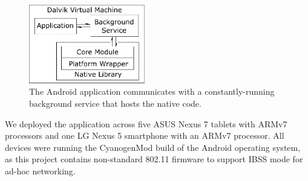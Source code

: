 \documentclass[10pt]{sig-alternate}
\begin{document}
\begin{figure}[h]
  \begin{center}
    \includegraphics[width=0.45\textwidth]{android-impl.pdf}
  \end{center}

  \caption{\small The Android application communicates with a constantly-running background service that hosts the native code.}
  \label{fig:ns3-impl}
\end{figure}


We deployed the application across five ASUS Nexus 7 tablets with ARMv7 processors and one LG Nexus 5 smartphone with an ARMv7 processor. All devices were running the CyanogenMod build of the Android operating system, as this project contains non-standard 802.11 firmware to support IBSS mode for ad-hoc networking.
\end{document}
